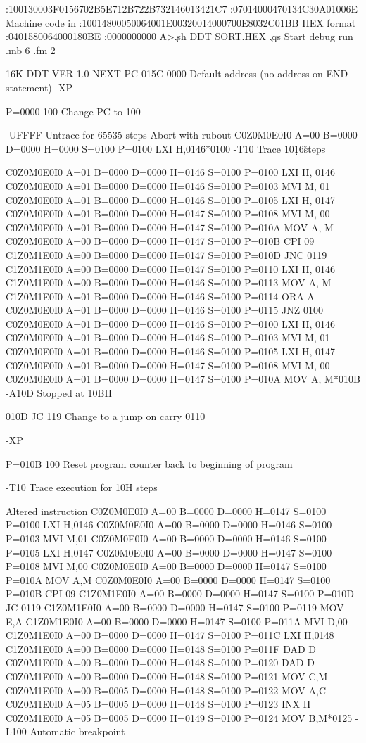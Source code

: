 :100130003F0156702B5E712B722B732146013421C7
:07014000470134C30A01006E                      Machine code in
:10014800050064001E00320014000700E8032C01BB    HEX format
:0401580064000180BE
:0000000000
A>\c
.sh
DDT SORT.HEX        \c
.qs
Start debug run
.mb 6
.fm 2

16K DDT VER 1.0
NEXT PC
015C 0000     Default address (no address on END statement)
-XP

P=0000 100    Change PC to 100

-UFFFF    Untrace for 65535 steps
                                           Abort with rubout
C0Z0M0E0I0 A=00 B=0000 D=0000 H=0000 S=0100 P=0100 LXI H,0146*0100
-T10    Trace 10\d16\u steps

C0Z0M0E0I0 A=01 B=0000 D=0000 H=0146 S=0100 P=0100 LXI H, 0146
C0Z0M0E0I0 A=01 B=0000 D=0000 H=0146 S=0100 P=0103 MVI M, 01
C0Z0M0E0I0 A=01 B=0000 D=0000 H=0146 S=0100 P=0105 LXI H, 0147
C0Z0M0E0I0 A=01 B=0000 D=0000 H=0147 S=0100 P=0108 MVI M, 00
C0Z0M0E0I0 A=01 B=0000 D=0000 H=0147 S=0100 P=010A MOV A, M 
C0Z0M0E0I0 A=00 B=0000 D=0000 H=0147 S=0100 P=010B CPI 09
C1Z0M1E0I0 A=00 B=0000 D=0000 H=0147 S=0100 P=010D JNC 0119
C1Z0M1E0I0 A=00 B=0000 D=0000 H=0147 S=0100 P=0110 LXI H, 0146
C1Z0M1E0I0 A=00 B=0000 D=0000 H=0146 S=0100 P=0113 MOV A, M
C1Z0M1E0I0 A=01 B=0000 D=0000 H=0146 S=0100 P=0114 ORA A
C0Z0M0E0I0 A=01 B=0000 D=0000 H=0146 S=0100 P=0115 JNZ 0100
C0Z0M0E0I0 A=01 B=0000 D=0000 H=0146 S=0100 P=0100 LXI H, 0146
C0Z0M0E0I0 A=01 B=0000 D=0000 H=0146 S=0100 P=0103 MVI M, 01
C0Z0M0E0I0 A=01 B=0000 D=0000 H=0146 S=0100 P=0105 LXI H, 0147
C0Z0M0E0I0 A=01 B=0000 D=0000 H=0147 S=0100 P=0108 MVI M, 00
C0Z0M0E0I0 A=01 B=0000 D=0000 H=0147 S=0100 P=010A MOV A, M*010B
-A10D                                       Stopped at 10BH

010D JC 119   Change to a jump on carry
0110

-XP

P=010B 100   Reset program counter back to beginning of program

-T10    Trace execution for 10H steps

                                              Altered instruction
C0Z0M0E0I0 A=00 B=0000 D=0000 H=0147 S=0100 P=0100 LXI H,0146
C0Z0M0E0I0 A=00 B=0000 D=0000 H=0146 S=0100 P=0103 MVI M,01
C0Z0M0E0I0 A=00 B=0000 D=0000 H=0146 S=0100 P=0105 LXI H,0147
C0Z0M0E0I0 A=00 B=0000 D=0000 H=0147 S=0100 P=0108 MVI M,00
C0Z0M0E0I0 A=00 B=0000 D=0000 H=0147 S=0100 P=010A MOV A,M
C0Z0M0E0I0 A=00 B=0000 D=0000 H=0147 S=0100 P=010B CPI 09
C1Z0M1E0I0 A=00 B=0000 D=0000 H=0147 S=0100 P=010D JC 0119
C1Z0M1E0I0 A=00 B=0000 D=0000 H=0147 S=0100 P=0119 MOV E,A
C1Z0M1E0I0 A=00 B=0000 D=0000 H=0147 S=0100 P=011A MVI D,00
C1Z0M1E0I0 A=00 B=0000 D=0000 H=0147 S=0100 P=011C LXI H,0148
C1Z0M1E0I0 A=00 B=0000 D=0000 H=0148 S=0100 P=011F DAD D
C0Z0M1E0I0 A=00 B=0000 D=0000 H=0148 S=0100 P=0120 DAD D
C0Z0M1E0I0 A=00 B=0000 D=0000 H=0148 S=0100 P=0121 MOV C,M
C0Z0M1E0I0 A=00 B=0005 D=0000 H=0148 S=0100 P=0122 MOV A,C
C0Z0M1E0I0 A=05 B=0005 D=0000 H=0148 S=0100 P=0123 INX H
C0Z0M1E0I0 A=05 B=0005 D=0000 H=0149 S=0100 P=0124 MOV B,M*0125
-L100                               Automatic breakpoint

